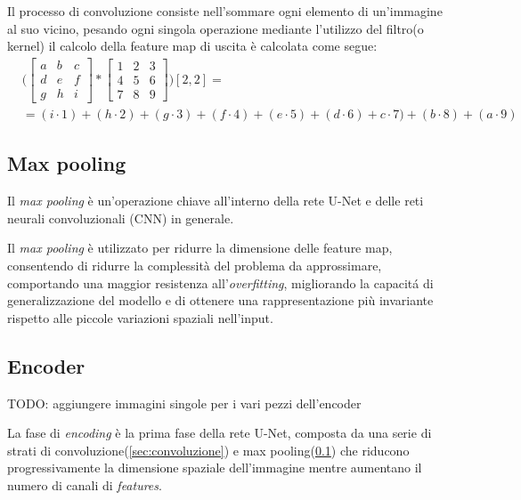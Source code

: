 Il processo di convoluzione consiste nell'sommare ogni elemento di un'immagine al suo vicino, pesando ogni singola operazione mediante l'utilizzo del filtro(o kernel) il calcolo della feature map di uscita è calcolata come segue:
\begin{align}
  &\Bigg( \begin{bmatrix}
    a & b & c \\
    d & e & f \\
    g & h & i
  \end{bmatrix}
  *
  \begin{bmatrix}
    1 & 2 & 3 \\
    4 & 5 & 6 \\
    7 & 8 & 9
  \end{bmatrix}
  \Bigg) [2, 2] =\\
  &= (i \cdot 1) + (h \cdot 2) + (g \cdot 3) + (f \cdot 4) + ( e \cdot 5 ) + ( d \cdot 6 ) + c \cdot 7) + (b \cdot 8) + (a \cdot 9)
\end{align}



\subsection{Max pooling} %
\label{sec:Max pooling}
Il \textit{max pooling} è un'operazione chiave all'interno della rete U-Net e delle reti neurali convoluzionali (CNN) in generale.

Il \textit{max pooling} è utilizzato per ridurre la dimensione delle feature map, consentendo di ridurre la complessità del problema da approssimare, comportando una maggior resistenza all'\textit{overfitting}, migliorando la capacit\'a di generalizzazione del modello e di ottenere una rappresentazione più invariante rispetto alle piccole variazioni spaziali nell'input.



\subsection{Encoder} %
\label{sec:Encoder}

TODO: aggiungere immagini singole per i vari pezzi dell'encoder

La fase di \textit{encoding} è la prima fase della rete U-Net, composta da una serie di strati di convoluzione(\ref{sec:convoluzione}) e max pooling(\ref{sec:Max pooling}) che riducono progressivamente la dimensione spaziale dell'immagine mentre aumentano il numero di canali di \textit{features}.

